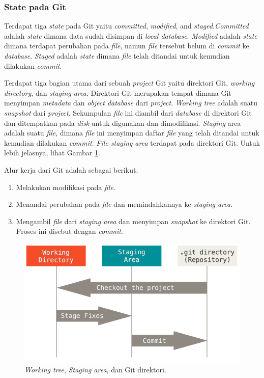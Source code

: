 \subsubsection{State pada Git}
Terdapat tiga \textit{state} pada Git yaitu \textit{committed}, \textit{modified}, and \textit{staged}.\textit{Committed} adalah \textit{state} dimana data sudah disimpan di \textit{local database}. \textit{Modified} adalah \textit{state} dimana terdapat perubahan pada \textit{file}, namun \textit{file} tersebut belum di \textit{commit} ke \textit{database}. \textit{Staged} adalah \textit{state} dimana \textit{file} telah ditandai untuk kemudian dilakukan \textit{commit}.

Terdapat tiga bagian utama dari sebuah \textit{project} Git yaitu direktori Git, \textit{working directory}, dan \textit{staging area}. Direktori Git merupakan tempat dimana Git menyimpan \textit{metadata} dan \textit{object database} dari \textit{project}. \textit{Working tree} adalah suatu \textit{snapshot} dari \textit{project}. Sekumpulan \textit{file} ini diambil dari \textit{database} di direktori Git dan ditempatkan pada \textit{disk} untuk digunakan dan dimodifikasi. \textit{Staging} area adalah suatu \textit{file}, dimana \textit{file} ini menyimpan daftar \textit{file} yang telah ditandai untuk kemudian dilakukan \textit{commit}. \textit{File staging area} terdapat pada direktori Git. Untuk lebih jelasnya, lihat Gambar \ref{fig:git_state}.

Alur kerja dari Git adalah sebagai berikut:
\begin{enumerate}
\item Melakukan modifikasi pada \textit{file}.
\item Menandai perubahan pada \textit{file} dan memindahkannya ke \textit{staging area}.
\item Mengambil \textit{file} dari \textit{staging area} dan menyimpan \textit{snapshot} ke direktori Git. Proses ini disebut dengan \textit{commit}.
\end{enumerate}  

\begin{figure}[H]
	\centering
		\includegraphics[scale=0.5]{Gambar/git_state.png}
	\caption{ \textit{Working tree}, \textit{Staging area}, dan Git direktori\cite{chacon2014pro}.}
	\label{fig:git_state}
\end{figure}


